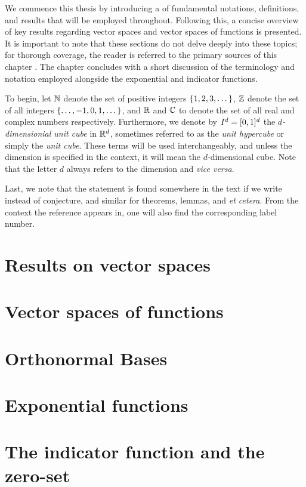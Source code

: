 \documentclass[../thesis.tex]{subfiles}
\begin{document}
We commence this thesis by introducing a  of fundamental notations, definitions, and results that will be employed throughout. Following this, a concise overview of key results regarding vector spaces and vector spaces of functions is presented. It is important to note that these sections do not delve deeply into these topics; for thorough coverage, the reader is referred to the primary sources of this chapter \cite{heilMetricsNormsInner2018,heilIntroductionRealAnalysis2019}. The chapter concludes with a short discussion of the terminology and notation employed alongside the exponential and indicator functions.

To begin, let $\mathbb{N}$ denote the set of positive integers $\{1,2,3, \dots\}$, $\mathbb{Z}$ denote the set of all integers $\{\dots, -1,0,1, \dots\}$, and $\mathbb{R}$ and $\mathbb{C}$ to denote the set of all real and complex numbers respectively. Furthermore, we denote by $I^d = [0,1]^d$ the \emph{$d$-dimensionial unit cube} in $\mathbb{R}^d$, sometimes referred to as the \emph{unit hypercube} or simply the \emph{unit cube}. These terms will be used interchangeably, and unless the dimension is specified in the context, it will mean the $d$-dimensional cube. Note that the letter $d$ always refers to the dimension and \emph{vice versa}.

Last, we note that the statement is found somewhere in the text if we write  instead of conjecture, and similar for theorems, lemmas, and \emph{et cetera}. From the context the reference appears in, one will also find the corresponding label number.

\section{Results on vector spaces}  %
    

\section{Vector spaces of functions}  %
    

\section{Orthonormal Bases}
    

\section{Exponential functions}
    

\section{The indicator function and the zero-set}\label{sec:indicator_zero_set}
    
\end{document}
